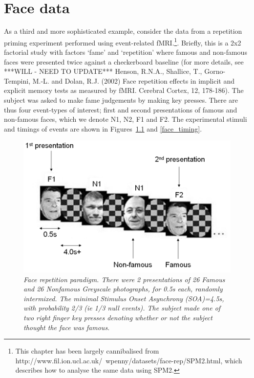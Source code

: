 \documentclass[a4paper,titlepage]{book}
\begin{document}
\chapter{Face data}

As a third and more sophisticated example, consider the data from a repetition priming experiment performed using event-related fMRI.\footnote{This chapter has been largely cannibalised from {\sf http://www.fil.ion.ucl.ac.uk/~wpenny/datasets/face-rep/SPM2.html}, which describes how to analyse the same data using SPM2.}. 
 Briefly, this is a 2x2 factorial study with factors `fame' and `repetition' where famous and non-famous faces were presented twice against a checkerboard baseline (for more details, see \cite{rnah_face_rep} ***WILL - NEED TO UPDATE*** Henson, R.N.A., Shallice, T., Gorno-Tempini, M.-L. and Dolan, R.J. (2002) Face repetition effects in implicit and explicit memory tests as measured by fMRI. Cerebral Cortex, 12, 178-186). The subject was asked to make fame judgements by making key presses. There are thus four event-types of interest; first and second presentations of famous and non-famous faces, which 
we denote N1, N2, F1 and F2. The experimental stimuli and timings of events are shown in Figures~\ref{face_stim} and \ref{face_timing}.
\begin{figure}
\begin{center}
\includegraphics[width=120mm]{faces/face_stim}
\caption{\em Face repetition paradigm.  There were 2 presentations of 26 Famous and 26 Nonfamous Greyscale photographs, for 0.5s each, randomly intermixed. The 
minimal Stimulus Onset Asynchrony (SOA)=4.5s, with probability 2/3 (ie 1/3 null events). The subject made one of two 
right finger key presses denoting whether or not the subject thought the face was famous. \label{face_stim}}
\end{center}
\end{figure}
\end{document}
